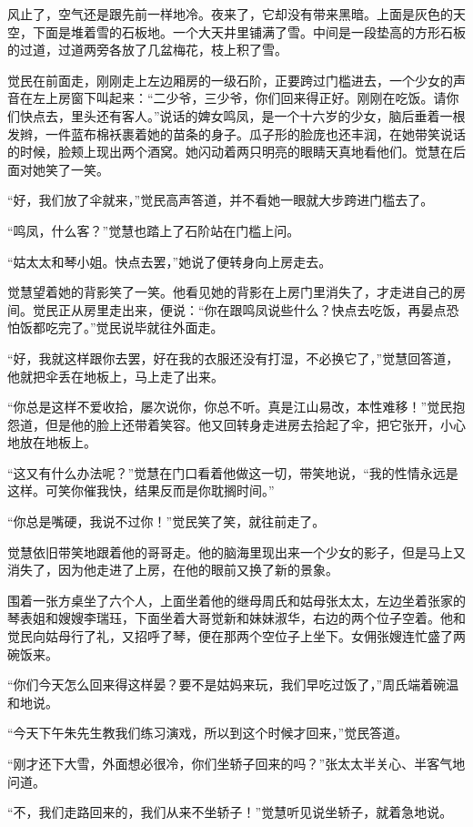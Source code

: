 \par 风止了，空气还是跟先前一样地冷。夜来了，它却没有带来黑暗。上面是灰色的天空，下面是堆着雪的石板地。一个大天井里铺满了雪。中间是一段垫高的方形石板的过道，过道两旁各放了几盆梅花，枝上积了雪。
\par 觉民在前面走，刚刚走上左边厢房的一级石阶，正要跨过门槛进去，一个少女的声音在左上房窗下叫起来：“二少爷，三少爷，你们回来得正好。刚刚在吃饭。请你们快点去，里头还有客人。”说话的婢女鸣凤，是一个十六岁的少女，脑后垂着一根发辫，一件蓝布棉袄裹着她的苗条的身子。瓜子形的脸庞也还丰润，在她带笑说话的时候，脸颊上现出两个酒窝。她闪动着两只明亮的眼睛天真地看他们。觉慧在后面对她笑了一笑。
\par “好，我们放了伞就来，”觉民高声答道，并不看她一眼就大步跨进门槛去了。
\par “鸣凤，什么客？”觉慧也踏上了石阶站在门槛上问。
\par “姑太太和琴小姐。快点去罢，”她说了便转身向上房走去。
\par 觉慧望着她的背影笑了一笑。他看见她的背影在上房门里消失了，才走进自己的房间。觉民正从房里走出来，便说：“你在跟鸣凤说些什么？快点去吃饭，再晏点恐怕饭都吃完了。”觉民说毕就往外面走。
\par “好，我就这样跟你去罢，好在我的衣服还没有打湿，不必换它了，”觉慧回答道，他就把伞丢在地板上，马上走了出来。
\par “你总是这样不爱收拾，屡次说你，你总不听。真是江山易改，本性难移！”觉民抱怨道，但是他的脸上还带着笑容。他又回转身走进房去拾起了伞，把它张开，小心地放在地板上。
\par “这又有什么办法呢？”觉慧在门口看着他做这一切，带笑地说，“我的性情永远是这样。可笑你催我快，结果反而是你耽搁时间。”
\par “你总是嘴硬，我说不过你！”觉民笑了笑，就往前走了。
\par 觉慧依旧带笑地跟着他的哥哥走。他的脑海里现出来一个少女的影子，但是马上又消失了，因为他走进了上房，在他的眼前又换了新的景象。
\par 围着一张方桌坐了六个人，上面坐着他的继母周氏和姑母张太太，左边坐着张家的琴表姐和嫂嫂李瑞珏，下面坐着大哥觉新和妹妹淑华，右边的两个位子空着。他和觉民向姑母行了礼，又招呼了琴，便在那两个空位子上坐下。女佣张嫂连忙盛了两碗饭来。
\par “你们今天怎么回来得这样晏？要不是姑妈来玩，我们早吃过饭了，”周氏端着碗温和地说。
\par “今天下午朱先生教我们练习演戏，所以到这个时候才回来，”觉民答道。
\par “刚才还下大雪，外面想必很冷，你们坐轿子回来的吗？”张太太半关心、半客气地问道。
\par “不，我们走路回来的，我们从来不坐轿子！”觉慧听见说坐轿子，就着急地说。
